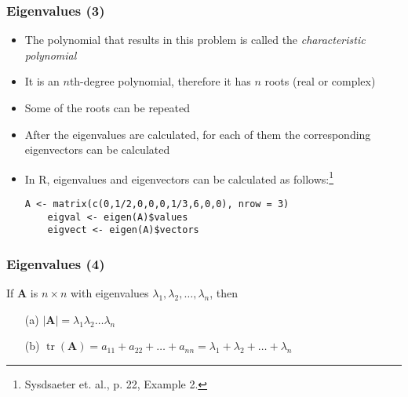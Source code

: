 \documentclass[10pt]{beamer}
\DeclareMathOperator{\tr}{tr}
\theoremstyle{definition}
\begin{document}
\begin{frame}[fragile]
\frametitle{Eigenvalues (3)}
\begin{itemize}
	\item The polynomial that results in this problem is called the \textit{characteristic polynomial}
	\item It is an $n$th-degree polynomial, therefore it has $n$ roots (real or complex)
	\item Some of the roots can be repeated
	\item After the eigenvalues are calculated, for each of them the corresponding eigenvectors can be calculated
	\item In R, eigenvalues and eigenvectors can be calculated as follows:\footnote{Sysdsaeter et. al., p. 22, Example 2.}
	\begin{lstlisting}[style = rstyle, breaklines]
	A <- matrix(c(0,1/2,0,0,0,1/3,6,0,0), nrow = 3)
	eigval <- eigen(A)$values
	eigvect <- eigen(A)$vectors	
	\end{lstlisting}
\end{itemize}
\end{frame}

\begin{frame}[fragile]
\frametitle{Eigenvalues (4)}
\begin{theorem}
	If $\mathbf{A}$ is $n\times n$ with eigenvalues $\lambda_{1},\lambda_{2},\ldots,\lambda_{n}$, then
	\begin{itemize}
		\item[(a)] $|\mathbf{A}| = \lambda_{1}\lambda_{2}\ldots\lambda_{n}$
		\item[(b)] $\tr(\mathbf{A}) = a_{11} + a_{22} + \ldots + a_{nn} = \lambda_{1} + \lambda_{2} + \ldots + \lambda_{n}$
	\end{itemize}
\end{theorem}
\end{frame}
\end{document}
